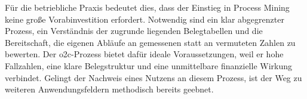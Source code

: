 Für die betriebliche Praxis bedeutet dies, dass der Einstieg in Process Mining keine große Vorabinvestition erfordert. Notwendig sind ein klar abgegrenzter Prozess, ein Verständnis der zugrunde liegenden Belegtabellen und die Bereitschaft, die eigenen Abläufe an gemessenen statt an vermuteten Zahlen zu bewerten. Der \gls{o2c}-Prozess bietet dafür ideale Voraussetzungen, weil er hohe Fallzahlen, eine klare Belegstruktur und eine unmittelbare finanzielle Wirkung verbindet. Gelingt der Nachweis eines Nutzens an diesem Prozess, ist der Weg zu weiteren Anwendungsfeldern methodisch bereits geebnet.
